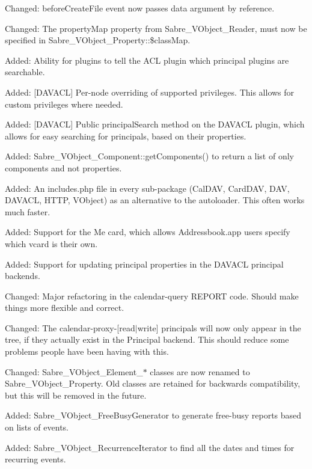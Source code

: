 \begin{DoxyItemize}
\item Changed\+: before\+Create\+File event now passes data argument by reference.
\item Changed\+: The \textquotesingle{}property\+Map\textquotesingle{} property from Sabre\+\_\+\+V\+Object\+\_\+\+Reader, must now be specified in Sabre\+\_\+\+V\+Object\+\_\+\+Property\+::\$class\+Map.
\item Added\+: Ability for plugins to tell the A\+CL plugin which principal plugins are searchable.
\item Added\+: \mbox{[}D\+A\+V\+A\+CL\mbox{]} Per-\/node overriding of supported privileges. This allows for custom privileges where needed.
\item Added\+: \mbox{[}D\+A\+V\+A\+CL\mbox{]} Public \textquotesingle{}principal\+Search\textquotesingle{} method on the D\+A\+V\+A\+CL plugin, which allows for easy searching for principals, based on their properties.
\item Added\+: Sabre\+\_\+\+V\+Object\+\_\+\+Component\+::get\+Components() to return a list of only components and not properties.
\item Added\+: An includes.\+php file in every sub-\/package (Cal\+D\+AV, Card\+D\+AV, D\+AV, D\+A\+V\+A\+CL, H\+T\+TP, V\+Object) as an alternative to the autoloader. This often works much faster.
\item Added\+: Support for the \textquotesingle{}Me card\textquotesingle{}, which allows Addressbook.\+app users specify which vcard is their own.
\item Added\+: Support for updating principal properties in the D\+A\+V\+A\+CL principal backends.
\item Changed\+: Major refactoring in the calendar-\/query R\+E\+P\+O\+RT code. Should make things more flexible and correct.
\item Changed\+: The calendar-\/proxy-\/\mbox{[}read$\vert$write\mbox{]} principals will now only appear in the tree, if they actually exist in the Principal backend. This should reduce some problems people have been having with this.
\item Changed\+: Sabre\+\_\+\+V\+Object\+\_\+\+Element\+\_\+$\ast$ classes are now renamed to Sabre\+\_\+\+V\+Object\+\_\+\+Property. Old classes are retained for backwards compatibility, but this will be removed in the future.
\item Added\+: Sabre\+\_\+\+V\+Object\+\_\+\+Free\+Busy\+Generator to generate free-\/busy reports based on lists of events.
\item Added\+: Sabre\+\_\+\+V\+Object\+\_\+\+Recurrence\+Iterator to find all the dates and times for recurring events.

\end{DoxyItemize}
